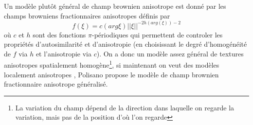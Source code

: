 \documentclass[11pt]{article} %
\begin{document}
	Un modèle plutôt général de champ brownien anisotrope est donné par les champs browniens fractionnaires anisotropes définis par
	\begin{equation}
		f(\xi) = c(arg\xi)||\xi||^{-2h(arg(\xi)) - 2} 
	\end{equation}
	où $c$ et $h$ sont des fonctions $\pi$-périodiques qui permettent de controler les propriétés d'autosimilarité et d'anisotropie (en choisissant le degré d'homogénéité de $f$ via $h$ et l'anisotropie via $c$).
	\newline
	On a donc un modèle assez général de textures anisotropes spatialement homogène\footnote{La variation du champ dépend de la direction dans laquelle on regarde la variation, mais pas de la position d'où l'on regarde}, si maintenant on veut des modèles localement anisotropes , Polisano propose le modèle de champ brownien fractionnaire anisotrope généralisé.
\end{document}

